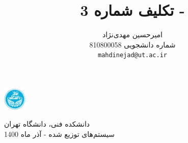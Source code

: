\documentclass{article}
\title{تکلیف شماره 3
 - 
 \lr{Leader Election}}
\author{%
  امیرحسین مهدی‌نژاد\\
  شماره دانشجویی 810800058\\
  \texttt{mahdinejad@ut.ac.ir} \\
}
\begin{document}
\begin{minipage}{0.1\textwidth}%
\includegraphics[width=1.1cm]{Photos/UT_logo.png}
\end{minipage}%
\hfill%
\begin{minipage}{0.9\textwidth}\raggedleft
دانشکده فنی، دانشگاه تهران\\
سیستم‌های توزیع شده - 
آذر
ماه 1400\\
\end{minipage}

\makepertitle

\end{document}
